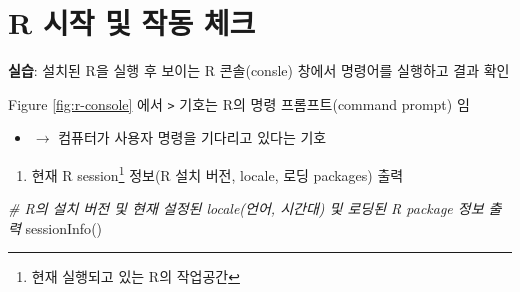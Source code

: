 \documentclass[
  11pt,
]{krantz}
\makeatletter
\newenvironment{Shaded}{\begin{snugshade}}{\end{snugshade}}
\newcommand{\CommentTok}[1]{\textcolor[rgb]{0.37,0.37,0.37}{\textit{#1}}}
\newcommand{\FunctionTok}[1]{\textcolor[rgb]{0,0,0}{#1}}
\newcommand{\NormalTok}[1]{#1}
\providecommand{\tightlist}{%
  \setlength{\itemsep}{0pt}\setlength{\parskip}{0pt}}
\newenvironment{kframe}{%
\medskip{}
\setlength{\fboxsep}{.8em}
 \def\at@end@of@kframe{}%
 \ifinner\ifhmode%
  \def\at@end@of@kframe{\end{minipage}}%
  \begin{minipage}{\columnwidth}%
 \fi\fi%
 \def\FrameCommand##1{\hskip\@totalleftmargin \hskip-\fboxsep
 \colorbox{shadecolor}{##1}\hskip-\fboxsep
     \hskip-\linewidth \hskip-\@totalleftmargin \hskip\columnwidth}%
 \MakeFramed {\advance\hsize-\width
   \@totalleftmargin\z@ \linewidth\hsize
   \@setminipage}}%
 {\par\unskip\endMakeFramed%
 \at@end@of@kframe}
\newenvironment{rmdblock}[1]
  {
  \begin{itemize}
  \renewcommand{\labelitemi}{
    \raisebox{-.7\height}[0pt][0pt]{
      {\setkeys{Gin}{width=3em,keepaspectratio}\texttt{[image: images/\#1]}}
    }
  }
  \setlength{\fboxsep}{1em}
  \begin{kframe}
  \item
  }
  {
  \end{kframe}
  \end{itemize}
  }
\newenvironment{rmdimportant}
  {\begin{rmdblock}{important}}
  {\end{rmdblock}}
\makeatother
\begin{document}
\normalsize

\hypertarget{r-check}{%
\section{R 시작 및 작동 체크}\label{r-check}}

\begin{rmdimportant}
\textbf{실습}: 설치된 R을 실행 후 보이는 R 콘솔(consle) 창에서 명령어를 실행하고 결과 확인
\end{rmdimportant}

Figure \ref{fig:r-console} 에서 \texttt{\textgreater{}} 기호는 R의 명령 프롬프트(command prompt) 임

\begin{itemize}
\tightlist
\item
  \(\rightarrow\) 컴퓨터가 사용자 명령을 기다리고 있다는 기호
\end{itemize}

\begin{enumerate}
\def\labelenumi{\arabic{enumi}.}
\tightlist
\item
  현재 R session\footnote{현재 실행되고 있는 R의 작업공간} 정보(R 설치 버전, locale, 로딩 packages) 출력
\end{enumerate}

\footnotesize

\begin{Shaded}
\begin{Highlighting}[]
\CommentTok{\# R의 설치 버전 및 현재 설정된 locale(언어, 시간대) 및 로딩된 R package 정보 출력}
\FunctionTok{sessionInfo}\NormalTok{() }
\end{Highlighting}
\end{Shaded}
\end{document}
